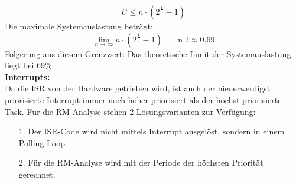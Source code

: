 \begin{equation}
U \leq n\cdot(2^\frac{1}{n}-1)
\end{equation}
Die maximale Systemauslastung beträgt: 
\begin{equation}
\lim_{n \to \infty}n\cdot(2^\frac{1}{n}-1) = \ln 2 \approx 0.69
\end{equation}
Folgerung aus diesem Grenzwert: Das theoretische Limit der Systemauslastung
liegt bei 69\%. \\

\textbf{Interrupts:} \\
Da die ISR von der Hardware getrieben wird, ist auch der niederwerdigst priorisierte Interrupt
immer noch höher priorisiert als der höchst priorisierte Task. Für die RM-Analyse stehen 2 Lösungsvarianten zur Verfügung:
\begin{itemize}
  \item[1.]  Der ISR-Code wird nicht mittels Interrupt ausgelöst, sondern in einem Polling-Loop.
  \item[2.]  Für die RM-Analyse wird mit der Periode der höchsten Priorität gerechnet.
\end{itemize}

